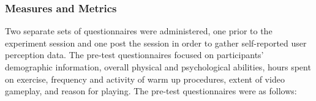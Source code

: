\subsubsection{Measures and Metrics}
Two separate sets of questionnaires were administered, one
prior to the experiment session and one post the session in order to gather self-reported user perception data.
The pre-test questionnaires focused on participants' demographic information, overall physical and psychological abilities, hours spent on exercise, frequency and activity
of warm up procedures, extent of video gameplay, and reason for playing. The pre-test questionnaires were as follows:
